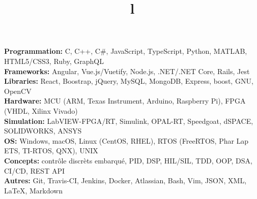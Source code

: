 \documentclass[mm]{res}
\begin{document}



\begin{resume}

\npspctoprule
\section{\headingskills}
\tb \textbf{Programmation:} C, C++, C\#, JavaScript, TypeScript, Python, MATLAB, HTML5/CSS3, Ruby, GraphQL\\
\tb \textbf{Frameworks:} Angular, Vue.js/Vuetify, Node.js, .NET/.NET Core, Rails, Jest\\
\tb \textbf{Libraries:} React, Boostrap, jQuery, MySQL, MongoDB, Express, boost, GNU, OpenCV\\
\tb \textbf{Hardware:} MCU (ARM, Texas Instrument, Arduino, Raspberry Pi), FPGA (VHDL, Xilinx Vivado)\\
\tb \textbf{Simulation:} LabVIEW-FPGA/RT, Simulink, OPAL-RT, Speedgoat, dSPACE, SOLIDWORKS, ANSYS\\
\tb \textbf{OS:} Windows, macOS, Linux (CentOS, RHEL), RTOS (FreeRTOS, Phar Lap ETS, TI-RTOS, QNX), UNIX\\
\tb \textbf{Concepts:} contr\^ole discr\`ets embarqu\'e, PID, DSP, HIL/SIL, TDD, OOP, DSA, CI/CD, REST API\\
\tb \textbf{Autres:} Git, Travis-CI, Jenkins, Docker, Atlassian, Bash, Vim, JSON, XML, \LaTeX, Markdown

\toprule

\section{\headingeducation}
\begin{format}
\\
\title{l}\\
\end{format}


\end{resume}
\end{document}
